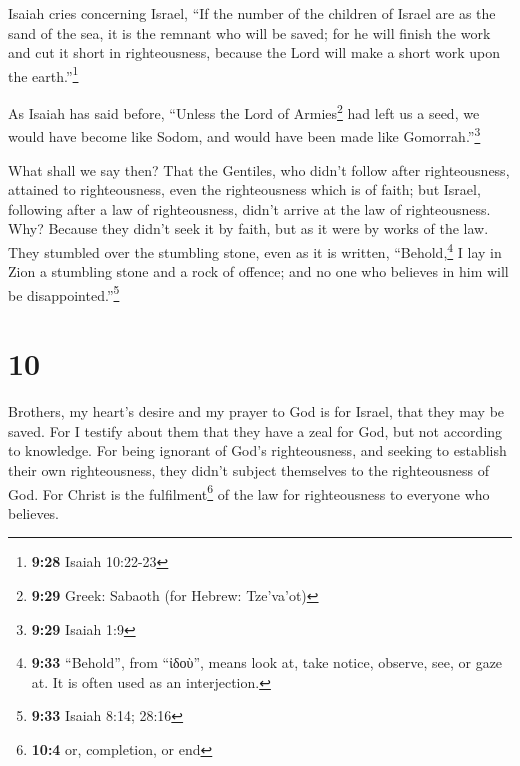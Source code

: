  Isaiah cries concerning Israel, ``If the number of the
children of Israel are as the sand of the sea, it is the remnant who
will be saved;  for he will finish the work and cut it
short in righteousness, because the Lord will make a short work upon the
earth.''\footnote{\textbf{9:28} Isaiah 10:22-23}

 As Isaiah has said before, ``Unless the Lord of
Armies\footnote{\textbf{9:29} Greek: Sabaoth (for Hebrew: Tze'va'ot)}
had left us a seed, we would have become like Sodom, and would have been
made like Gomorrah.''\footnote{\textbf{9:29} Isaiah 1:9}

 What shall we say then? That the Gentiles, who didn't
follow after righteousness, attained to righteousness, even the
righteousness which is of faith;  but Israel, following
after a law of righteousness, didn't arrive at the law of righteousness.
 Why? Because they didn't seek it by faith, but as it
were by works of the law. They stumbled over the stumbling stone,
 even as it is written, ``Behold,\footnote{\textbf{9:33}
  ``Behold'', from ``ἰδοὺ'', means look at, take notice, observe, see,
  or gaze at. It is often used as an interjection.} I lay in Zion a
stumbling stone and a rock of offence; and no one who believes in him
will be disappointed.''\footnote{\textbf{9:33} Isaiah 8:14; 28:16}

\hypertarget{section-9}{%
\section{10}\label{section-9}}

 Brothers, my heart's desire and my prayer to God is for
Israel, that they may be saved.  For I testify about them
that they have a zeal for God, but not according to knowledge.
 For being ignorant of God's righteousness, and seeking to
establish their own righteousness, they didn't subject themselves to the
righteousness of God.  For Christ is the
fulfilment\footnote{\textbf{10:4} or, completion, or end} of the law for
righteousness to everyone who believes.

